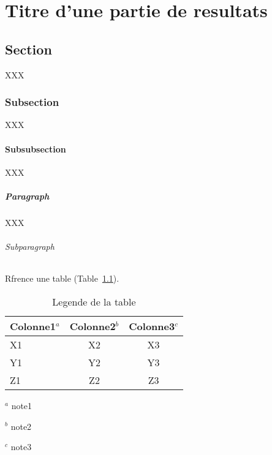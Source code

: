 \chapter{Titre d'une partie de resultats}
\label{chap:resultats2}

\section{Section}

XXX

\subsection{Subsection}

XXX

\subsubsection{Subsubsection}

XXX

\paragraph{Paragraph}

XXX

\subparagraph{Subparagraph}

Rfrence  une table (Table~\ref{tab:label_table}).

\begin{table}[!htbp]
\centering

\caption{Legende de la table}

\vspace{2ex}
\begin{tabular}{lcc}
\hline
Colonne1$^a$ & Colonne2$^b$ & Colonne3$^c$\\
\hline
X1 & X2 & X3\\
Y1 & Y2 & Y3\\
Z1 & Z2 & Z3\\
\hline
\end{tabular}

\bigskip

{\raggedright

$^a$ note1

$^b$ note2

$^c$ note3

}

\label{tab:label_table}
\end{table}

